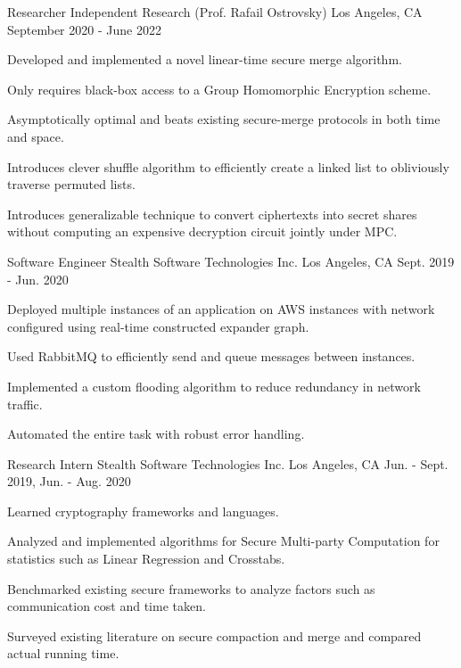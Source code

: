 \begin{cventries}
  \cventry
    {Researcher} %
    {Independent Research (Prof. Rafail Ostrovsky)} %
    {Los Angeles, CA} %
    {September 2020 - June 2022} %
    {
      \begin{cvitems} %
        \item{Developed and implemented a novel linear-time secure merge algorithm.}
        \item{Only requires black-box access to a Group Homomorphic Encryption scheme.}
        \item{Asymptotically optimal and beats existing secure-merge protocols in both time and space.}
        \item{Introduces clever shuffle algorithm to efficiently create a linked list to obliviously traverse permuted lists.}
        \item{Introduces generalizable technique to convert ciphertexts into secret shares without computing an expensive decryption circuit jointly under MPC.}
      \end{cvitems}
    }

  \cventry
    {Software Engineer} %
    {Stealth Software Technologies Inc.} %
    {Los Angeles, CA} %
    {Sept. 2019 - Jun. 2020} %
    {
      \begin{cvitems} %
        \item{Deployed multiple instances of an application on AWS instances with network configured using real-time constructed expander
graph.}
        \item{Used RabbitMQ to efficiently send and queue messages between instances.}
        \item{Implemented a custom flooding algorithm to reduce redundancy in network traffic.} 
        \item{Automated the entire task with robust error handling.}
      \end{cvitems}
    }
    
\cventry
{Research Intern} %
{Stealth Software Technologies Inc.} %
{Los Angeles, CA} %
{Jun. - Sept. 2019, Jun. - Aug. 2020} %
{
  \begin{cvitems} %
    \item{Learned cryptography frameworks and languages.}
    \item{Analyzed and implemented algorithms for Secure Multi-party Computation for statistics such as Linear Regression and Crosstabs.}
    \item{Benchmarked existing secure frameworks to analyze factors such as communication cost and time taken.}
    \item{Surveyed existing literature on secure compaction and merge and compared actual running time.}
  \end{cvitems}
}

\end{cventries}
